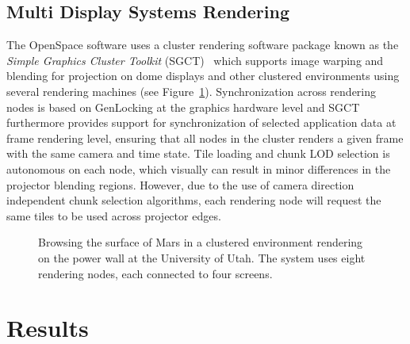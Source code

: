 \documentclass[journal]{vgtc}                %
\newcommand{\anderscomment}[1]{\textbf{[-Anders-~}
    \textcolor{cyan}{#1}
    \textbf{~]}}
\begin{document}
\subsection{Multi Display Systems Rendering} \label{sec:multidisplaysystems}
The OpenSpace software uses a cluster rendering software package known as the \emph{Simple Graphics Cluster Toolkit} (SGCT)~\cite{sgct} which supports image warping and blending for projection on dome displays and other clustered environments using several rendering machines (see Figure~\ref{fig:power_wall}).
Synchronization across rendering nodes is based on GenLocking at the graphics hardware level and SGCT furthermore provides support for synchronization of selected application data at frame rendering level, ensuring that all nodes in the cluster renders a given frame with the same camera and time state.
Tile loading and chunk LOD selection is autonomous on each node, which visually can result in minor differences in the projector blending regions. However, due to the use of camera direction independent chunk selection algorithms, each rendering node will request the same tiles to be used across projector edges.

\begin{figure}[b]\vspace{-4mm}
    \centering
        \caption{Browsing the surface of Mars in a clustered environment rendering on the power wall at the University of Utah. The system uses eight rendering nodes, each connected to four screens.}
    \label{fig:power_wall}
\end{figure}

\section{Results}
\end{document}
